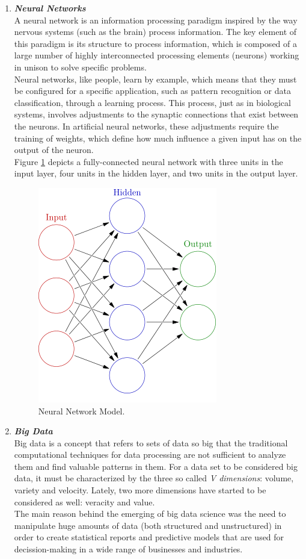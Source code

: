 \documentclass{article}
\begin{document}
\begin{enumerate}[label=(\alph*)]
\begin{enumerate}[label=\textbf{\arabic*.}]
            \item \textbf{\textit{Neural Networks}}\\
A neural network is an information processing paradigm inspired by the way nervous systems (such as the brain) process information. The key element of this paradigm is its structure to process information, which is composed of a large number of highly interconnected processing elements (neurons) working in unison to solve specific problems.\\
Neural networks, like people, learn by example, which means that they must be configured for a specific application, such as pattern recognition or data classification, through a learning process. This process, just as in biological systems, involves adjustments to the synaptic connections that exist between the neurons. In artificial neural networks, these adjustments require the training of weights, which define how much influence a given input has on the output of the neuron.\\
Figure \ref{nn} depicts a fully-connected neural network with three units in the input layer, four units in the hidden layer, and two units in the output layer.
	\begin{figure}[ht]
		\centering
		\includegraphics[width=0.5\linewidth]{nn.png}
		\caption{Neural Network Model.}
		\label{nn}
	\end{figure}
	
            \item \textbf{\textit{Big Data}}\\
Big data is a concept that refers to sets of data so big that the traditional computational techniques for data processing are not sufficient to analyze them and find valuable patterns in them. For a data set to be considered big data, it must be characterized by the three so called \emph{V dimensions}: volume, variety and velocity. Lately, two more dimensions have started to be considered as well: veracity and value.\\
The main reason behind the emerging of big data science was the need to manipulate huge amounts of data (both structured and unstructured) in order to create statistical reports and predictive models that are used for decission-making in a wide range of businesses and industries.


\end{enumerate}
\end{enumerate}
\end{document}
